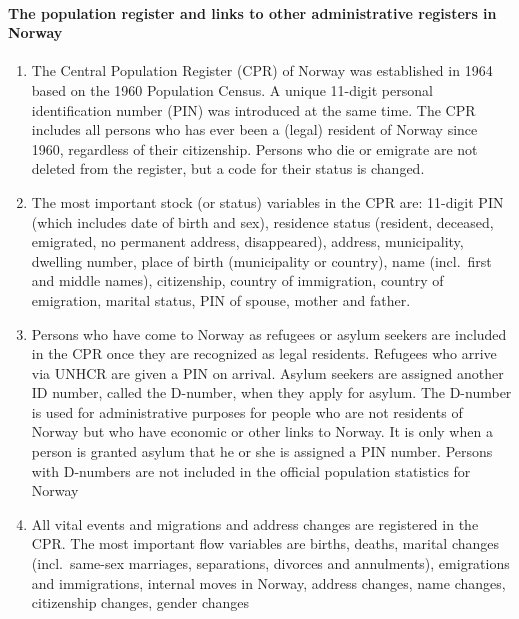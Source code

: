 \documentclass[
]{article}
\begin{document}
\hypertarget{the-population-register-and-links-to-other-administrative-registers-in-norway-1}{%
\paragraph{The population register and links to other administrative registers in Norway}\label{the-population-register-and-links-to-other-administrative-registers-in-norway-1}}

\begin{enumerate}
\def\labelenumi{\arabic{enumi}.}
\setcounter{enumi}{244}
\item
  The Central Population Register (CPR) of Norway was established in
  1964 based on the 1960 Population Census. A unique 11-digit personal
  identification number (PIN) was introduced at the same time. The CPR
  includes all persons who has ever been a (legal) resident of Norway
  since 1960, regardless of their citizenship. Persons who die or
  emigrate are not deleted from the register, but a code for their
  status is changed.
\item
  The most important stock (or status) variables in the CPR are:
  11-digit PIN (which includes date of birth and sex), residence
  status (resident, deceased, emigrated, no permanent address,
  disappeared), address, municipality, dwelling number, place of birth
  (municipality or country), name (incl.~first and middle names),
  citizenship, country of immigration, country of emigration, marital
  status, PIN of spouse, mother and father.
\item
  Persons who have come to Norway as refugees or asylum seekers are
  included in the CPR once they are recognized as legal residents.
  Refugees who arrive via UNHCR are given a PIN on arrival. Asylum
  seekers are assigned another ID number, called the D-number, when
  they apply for asylum. The D-number is used for administrative
  purposes for people who are not residents of Norway but who have
  economic or other links to Norway. It is only when a person is
  granted asylum that he or she is assigned a PIN number. Persons with
  D-numbers are not included in the official population statistics for
  Norway
\item
  All vital events and migrations and address changes are registered
  in the CPR. The most important flow variables are births, deaths,
  marital changes (incl.~same-sex marriages, separations, divorces and
  annulments), emigrations and immigrations, internal moves in Norway,
  address changes, name changes, citizenship changes, gender changes

\end{enumerate}
\end{document}
